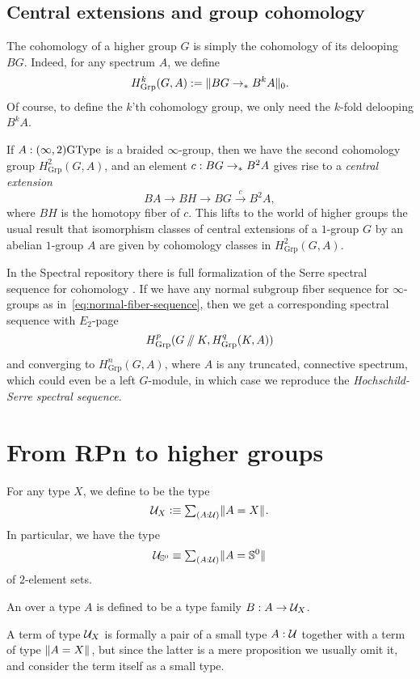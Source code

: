 \subsection{Central extensions and group cohomology}
\label{sec:group-cohomology}

The cohomology of a higher group $G$ is simply the cohomology of its
delooping $BG$. Indeed, for any spectrum $A$, we define
\[
  H_{\mathrm{Grp}}^k(G, A) := \trunc{0}{BG \to_\pt B^kA}.
\]
Of course, to define the $k$'th cohomology group, we only need the
$k$-fold delooping $B^kA$.

If $A:(\infty,2)\GType$ is a braided $\infty$-group, then
we have the second cohomology group $H_{\mathrm{Grp}}^2(G, A)$, and an
element $c:BG \to_\pt B^2A$ gives rise to a \emph{central extension}
\[
  BA \to BH \to BG \xrightarrow{c}{} B^2A,
\]
where $BH$ is the homotopy fiber of $c$.  This lifts to the world of
higher groups the usual result that isomorphism classes of central
extensions of a $1$-group $G$ by an abelian $1$-group $A$
are given by cohomology classes in $H_{\mathrm{Grp}}^2(G, A)$.

\smallskip

In the Spectral repository there is full formalization of the Serre
spectral sequence for cohomology \cite{SerreSpectralSequence}.
If we have any normal subgroup fiber sequence for $\infty$-groups as
in~\eqref{eq:normal-fiber-sequence}, then we get a corresponding
spectral sequence with $E_2$-page
\[
  H_{\mathrm{Grp}}^p(G \dblslash K, H_{\mathrm{Grp}}^q(K, A))
\]
and converging to $H_{\mathrm{Grp}}^n(G, A)$, where $A$ is any
truncated, connective spectrum, which could even be a left $G$-module,
in which case we reproduce the \emph{Hochschild-Serre spectral
  sequence}.

\section{From RPn to higher groups}

\begin{defn}
For any type $X$, we define  to be the type \[\UU_X\defeq\sm{A:\UU}\brck{A=X}.\] In particular, we have the type \[\UU_{\sphere{0}}\jdeq\sm{A:\UU}\brck{A={\sphere{0}}}\] of $2$\nobreakdash-element sets.

An  over a type $A$ is defined to be a type family $B:A\to\UU_X$. 
\end{defn}

A term of type $\UU_X$ is formally a pair of a small type $A:\UU$ together with a term of type $\brck{A=X}$, but since the latter is a mere proposition we usually omit it, and consider the term itself as a small type.
